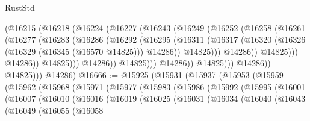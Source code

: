 \begin{lexlean}{RustStd}
\begin{coremodule}
                              (@16215
                                (@16218
                                  (@16224
                                    (@16227
                                      (@16243
                                        (@16249
                                          (@16252
                                            (@16258
                                              (@16261
                                                (@16277
                                                  (@16283
                                                    (@16286
                                                      (@16292
                                                        (@16295
                                                          (@16311
                                                            (@16317
                                                              (@16320
                                                                (@16326
                                                                  (@16329 (@16345 (@16570 @14825)))
                                                                  @14286))
                                                              @14825)))
                                                        @14286))
                                                    @14825)))
                                              @14286))
                                          @14825)))
                                    @14286))
                                @14825)))
                          @14286))
                      @14825)))
                @14286))
            @14825)))
      @14286)
@16666 := @15925
    (@15931
      (@15937
        (@15953
          (@15959
            (@15962
              (@15968
                (@15971
                  (@15977
                    (@15983
                      (@15986
                        (@15992
                          (@15995
                            (@16001
                              (@16007
                                (@16010
                                  (@16016
                                    (@16019
                                      (@16025
                                        (@16031
                                          (@16034
                                            (@16040
                                              (@16043
                                                (@16049
                                                  (@16055
                                                    (@16058

\end{coremodule}
\end{lexlean}
